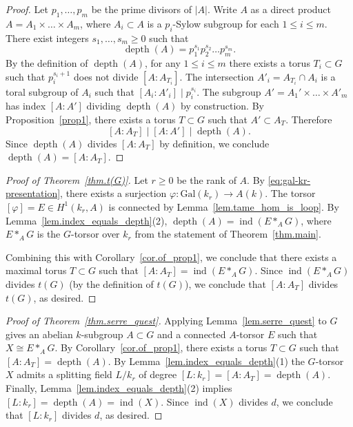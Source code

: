 \documentclass[12pt]{amsart}
\numberwithin{equation}{section}
\theoremstyle{remark}
\newcommand{\vphi}{\varphi}
\newcommand{\ind}{\operatorname{ind}}
\newcommand{\depth}{\operatorname{depth}}
\begin{document}
\begin{proof}
    Let $p_1,\dots,p_m$ be the prime divisors of $|A|$. Write $A$ as a direct product $A = A_1 \times\dots\times A_m$, where $A_i \subset A$ is a $p_i$-Sylow subgroup for each $1\leq i\leq m$. There exist integers $s_1,\dots,s_m\geqslant 0$ such that 
$$\depth(A)=  p_1^{s_1} p_2^{s_2} \ldots p_m^{s_m}.$$ 
By the definition of $\depth(A)$, for any $1\leq i\leq m$ there exists a torus $T_i\subset G$ such that $p_i^{s_i+1}$ does not divide $[A:A_{T_i}]$. The intersection $A'_i  = A_{T_i} \cap A_i$ is a toral subgroup of $A_i$ such that $[A_i:A'_i] \mid p_i^{s_i}$. The subgroup $A' = A_1'\times\dots\times A'_m$ has index $[A:A']$ dividing $\depth(A)$ by construction. By Proposition~\ref{prop1}, there exists a torus $T \subset G$ such that $A' \subset A_T$. Therefore $$[A:A_T] \mid [A:A'] \mid \depth(A).$$
Since $\depth(A)$ divides $[A:A_T]$ by definition, we conclude $\depth(A) = [A:A_T]$.
\end{proof}

\begin{proof}[Proof of Theorem~\ref{thm.t(G)}]
Let $r\geqslant 0$ be the rank of $A$. By \eqref{eq:gal-kr-presentation}, there exists a surjection $\vphi\colon \mathrm{Gal}(k_r)\to A(k)$. The torsor $[\vphi]=E \in H^1(k_r,A)$ is connected by Lemma~\ref{lem.tame_hom_is_loop}. 
By Lemma~\ref{lem.index_equals_depth}(2), $\depth(A) = \ind(E *_A G)$, where
$E*_A G$  is the $G$-torsor over $k_r$ from the statement of Theorem~\ref{thm.main}.

Combining this with Corollary~\ref{cor.of_prop1},
we conclude that there exists a maximal torus $T \subset G$ such that $[A: A_T] = \ind(E *_A G)$. 
Since $\ind(E *_A G)$ divides $t(G)$ (by the definition of $t(G)$), we conclude that
$[A: A_T]$ divides $t(G)$, as desired.
\end{proof}

\begin{proof}[Proof of Theorem~\ref{thm.serre_quest}]
    Applying Lemma~\ref{lem.serre_quest} to $G$ gives an abelian $k$-subgroup $A \subset G$ and a connected $A$-torsor $E$ such that $X \cong E\ast_A G$.
By Corollary~\ref{cor.of_prop1}, there exists a torus $T\subset G$ such that $[A:A_T] = \depth(A)$. By Lemma~\ref{lem.index_equals_depth}(1) the $G$-torsor $X$ admits a splitting field $L/k_r$ of degree $[L:k_r]=[A:A_T] = \depth(A)$.  Finally, Lemma~\ref{lem.index_equals_depth}(2) implies $[L:k_r]=\depth(A)=\ind(X)$. Since $\ind(X)$ divides $d$, we conclude that $[L:k_r]$ divides $d$, as desired.
\end{proof}
\end{document}
